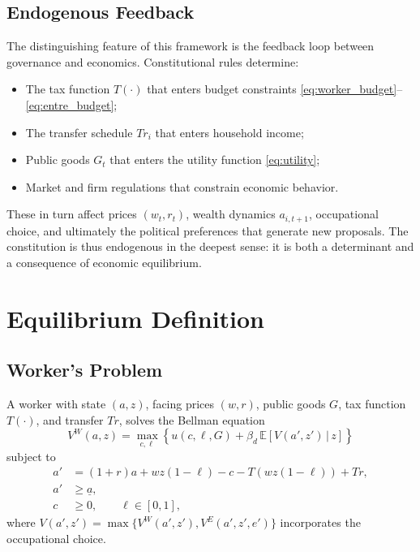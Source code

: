 \documentclass[12pt]{article}
\newcommand{\E}{\mathbb{E}}
\begin{document}
\subsection{Endogenous Feedback}\label{sec:feedback}

The distinguishing feature of this framework is the feedback loop between governance and economics. Constitutional rules determine:
\begin{itemize}
  \item The tax function $T(\cdot)$ that enters budget constraints \eqref{eq:worker_budget}--\eqref{eq:entre_budget};
  \item The transfer schedule $Tr_i$ that enters household income;
  \item Public goods $G_t$ that enters the utility function \eqref{eq:utility};
  \item Market and firm regulations that constrain economic behavior.
\end{itemize}
These in turn affect prices $(w_t, r_t)$, wealth dynamics $a_{i,t+1}$, occupational choice, and ultimately the political preferences that generate new proposals. The constitution is thus endogenous in the deepest sense: it is both a determinant and a consequence of economic equilibrium.


\section{Equilibrium Definition}\label{sec:equilibrium}

\subsection{Worker's Problem}

A worker with state $(a, z)$, facing prices $(w, r)$, public goods $G$, tax function $T(\cdot)$, and transfer $Tr$, solves the Bellman equation
\begin{equation}\label{eq:bellman_worker}
  V^W(a, z) = \max_{c, \ell} \left\{ u(c, \ell, G) + \beta_d \, \E\!\left[V(a', z') \,\big|\, z\right] \right\}
\end{equation}
subject to
\begin{align}
  a' &= (1 + r) a + w z (1 - \ell) - c - T(wz(1-\ell)) + Tr, \label{eq:bellman_budget}\\
  a' &\geq \underline{a}, \label{eq:bellman_borrow}\\
  c &\geq 0, \qquad \ell \in [0, 1], \label{eq:bellman_bounds}
\end{align}
where $V(a', z') = \max\{V^W(a', z'), V^E(a', z', e')\}$ incorporates the occupational choice.
\end{document}
